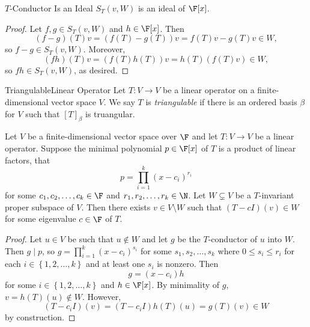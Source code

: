 \documentclass[linearalgebraII]{subfiles}
\begin{document}
    \clearpage
    \begin{prop}{$T$-Conductor Is an Ideal}
        $S_T(v, W)$ is an ideal of $\F[x]$.
    \end{prop}

    \begin{proof}
        Let $f,g\in S_T(v, W)$ and $h\in \F[x]$. Then
        \begin{equation*}
            (f-g)(T)v = \left( f(T)-g(T) \right) v = f(T)v - g(T)v\in W,
        \end{equation*}
        so $f-g\in S_T(v, W)$. Moreover,
        \begin{equation*}
            (fh)(T)v = (f(T)h(T))v = h(T) \left( f(T)v \right) \in W,
        \end{equation*}
        so $fh\in S_T(v, W)$, as desired.
    \end{proof}

    \begin{definition}{Triangulable}{Linear Operator}
        Let $T:V\to V$ be a linear operator on a finite-dimensional vector space $V$. We say $T$ is \emph{triangulable} if there is an ordered basis $\beta$ for $V$ such that $[T]_\beta$ is truangular.
    \end{definition}
    
    \begin{lemma}{}
        Let $V$ be a finite-dimensional vector space over $\F$ and let $T:V\to V$ be a linear operator. Suppose the minimal polynomial $p\in\F[x]$ of $T$ is a product of linear factors, that
        \begin{equation*}
            p = \prod^{k}_{i=1} (x-c_i)^{r_i}
        \end{equation*}
        for some $c_1, c_2, \ldots, c_k\in \F$ and $r_1, r_2, \ldots, r_k\in \N$. Let $W\subsetneq V$ be a $T$-invariant proper subspace of $V$. Then there exists $v\in V\setminus W$ such that $(T-cI)(v)\in W$ for some eigenvalue $c\in \F$ of $T$.
    \end{lemma}

    \begin{proof}
        Let $u\in V$ be such that $u\notin W$ and let $g$ be the $T$-conductor of $u$ into $W$. Then $g\mid p$, so $g = \prod^{k}_{i=1} (x-c_i)^{s_i}$ for some $s_1, s_2, \ldots, s_k$ where $0\leq s_i\leq r_i$ for each $i\in \left\lbrace 1, 2, \ldots, k \right\rbrace$ and at least one $s_i$ is nonzero. Then
        \begin{equation*}
            g = (x-c_i)h
        \end{equation*}
        for some $i\in \left\lbrace 1, 2, \ldots, k \right\rbrace$ and $h\in \F[x]$. By minimality of $g$, $v = h(T)(u)\notin W$. However,
        \begin{equation*}
            (T-c_iI)(v) = \left( T-c_iI \right)h(T)(u) = g(T)(v) \in W 
        \end{equation*}
        by construction.
    \end{proof}
\end{document}
